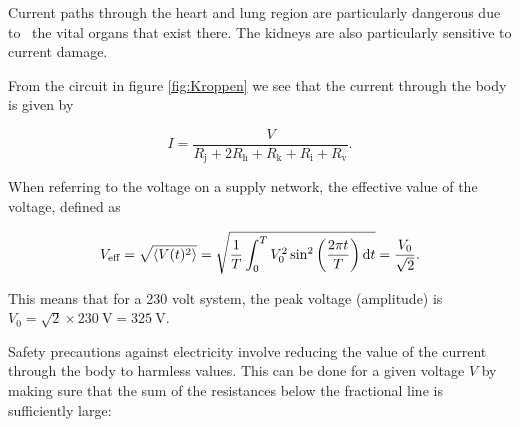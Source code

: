 \documentclass[../Elmag-labhefte-2020.tex]{subfiles}
\begin{document}
Current paths through the heart and lung region are particularly dangerous due to \ the vital organs that exist there. The kidneys are also particularly sensitive to current damage.

From the circuit in figure \ref{fig:Kroppen} we see that the current through the body is given by

\begin{equation}
    I = \frac{V}{R_\text{j} + 2R_\text{h} + R_\text{k} + R_\text{i} + R_\text{v}}.
    \label{eq:BodyVoltDiv}
\end{equation}

When referring to the voltage on a supply network, the effective value of the voltage, defined as

\begin{equation}
    V_\text{eff}
        = \sqrt{\langle V(t)^2 \rangle}
        = \sqrt{\frac{1}{T} \int_0^T V_0^2 \sin^2 \qty(\frac{2\pi t}{T}) \dd{t}}
        = \frac{V_0}{\sqrt{2}}.
    \label{eq:EffectiveV}
\end{equation}

This means that for a \num{230} volt system, the peak voltage (amplitude) is $V_0 = \sqrt{2} \times \SI{230}{\V} = \SI{325}{\V}$.

Safety precautions against electricity involve reducing the value of the current through the body to harmless values. This can be done for a given voltage $V$ by making sure that the sum of the resistances below the fractional line is sufficiently large:
\end{document}
